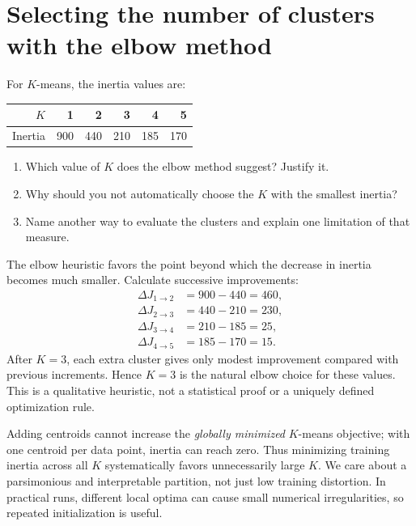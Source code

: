 \section{Selecting the number of clusters with the elbow method}
\label{sec:ex2}
\begin{problem}
For $K$-means, the inertia values are:
\begin{center}\begin{tabular}{@{}rrrrrr@{}}\toprule $K$&1&2&3&4&5\\\midrule Inertia&900&440&210&185&170\\\bottomrule\end{tabular}\end{center}
\begin{enumerate}[label=\textbf{(\alph*)}]
\item Which value of $K$ does the elbow method suggest? Justify it.
\item Why should you not automatically choose the $K$ with the smallest inertia?
\item Name another way to evaluate the clusters and explain one limitation of that measure.
\end{enumerate}
\end{problem}

The elbow heuristic favors the point beyond which the decrease in inertia becomes much smaller. Calculate successive improvements:
\[
\begin{aligned}
\Delta J_{1\to2}&=900-440=460,\\
\Delta J_{2\to3}&=440-210=230,\\
\Delta J_{3\to4}&=210-185=25,\\
\Delta J_{4\to5}&=185-170=15.
\end{aligned}
\]
After $K=3$, each extra cluster gives only modest improvement compared with previous increments. Hence $\boxed{K=3}$ is the natural elbow choice for these values. This is a qualitative heuristic, not a statistical proof or a uniquely defined optimization rule.

Adding centroids cannot increase the \emph{globally minimized} $K$-means objective; with one centroid per data point, inertia can reach zero. Thus minimizing training inertia across all $K$ systematically favors unnecessarily large $K$. We care about a parsimonious and interpretable partition, not just low training distortion. In practical runs, different local optima can cause small numerical irregularities, so repeated initialization is useful.

